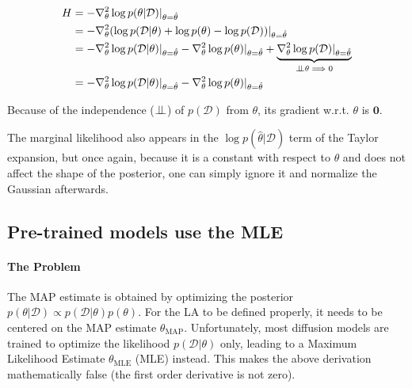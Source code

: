 \begin{align}
    H &= -\nabla^2_\theta \log p(\theta|\mathcal{D})|_{\theta=\hat\theta}\\
    &= -\nabla^2_\theta (\log p(\mathcal{D}|\theta) + \log p(\theta) - \log p(\mathcal{D})) |_{\theta=\hat\theta} \nonumber \\
    &= -\nabla^2_\theta \log p(\mathcal{D}|\theta)|_{\theta=\hat\theta} -\nabla^2_\theta \log p(\theta)|_{\theta=\hat\theta} +\underbrace{\nabla^2_\theta \log p(\mathcal{D}) |_{\theta=\hat\theta}}_{\perp\!\!\!\perp \theta \implies 0} \nonumber\\
    &= -\nabla^2_\theta \log p(\mathcal{D}|\theta)|_{\theta=\hat\theta} -\nabla^2_\theta \log p(\theta)|_{\theta=\hat\theta} \label{eq:hessian_joint}
\end{align}

Because of the independence ($\perp\!\!\!\perp$) of $p(\mathcal{D})$ from $\theta$, its gradient w.r.t. $\theta$ is $\boldsymbol{0}$.

The marginal likelihood also appears in the $\log p(\hat\theta | \mathcal{D})$ term of the Taylor expansion, but once again, because it is a constant with respect to $\theta$ and does not affect the shape of the posterior, one can simply ignore it and normalize the Gaussian afterwards.

\subsection{Pre-trained models use the MLE}
\label{sub:la_trained_on_mle}

\paragraph{The Problem}
The \acs{MAP} estimate is obtained by optimizing the posterior $p(\theta|\mathcal{D}) \propto p(\mathcal{D}|\theta)p(\theta)$. For the \acs{LA} to be defined properly, it needs to be centered on the \acs{MAP} estimate $\theta_{\text{MAP}}$. Unfortunately, most diffusion models are trained to optimize the likelihood $p(\mathcal{D} | \theta)$ only, leading to a Maximum Likelihood Estimate $\theta_{\mathrm{MLE}}$ (\acs{MLE}) instead. This makes the above derivation mathematically false (the first order derivative is not zero).

